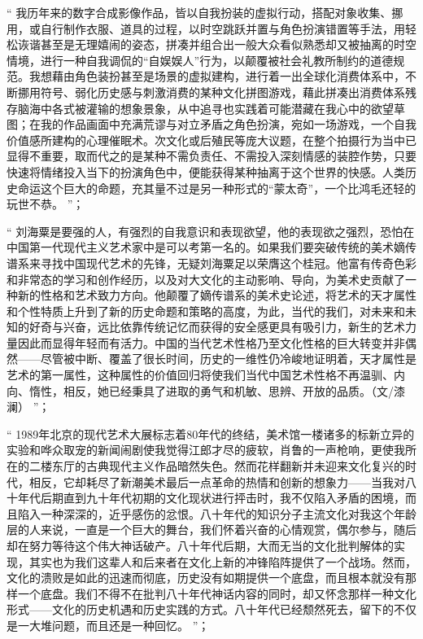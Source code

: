 \documentclass[master,oneside]{zjuthesis}
\begin{document}
“ 我历年来的数字合成影像作品，皆以自我扮装的虚拟行动，搭配对象收集、挪用，或自行制作衣服、道具的过程，以时空跳跃并置与角色扮演错置等手法，用轻松诙谐甚至是无理嬉闹的姿态，拼凑并组合出一般大众看似熟悉却又被抽离的时空情境，进行一种自我调侃的“自娱娱人”行为，以颠覆被社会礼教所制约的道德规范。我想藉由角色装扮甚至是场景的虚拟建构，进行着一出全球化消费体系中，不断挪用符号、弱化历史感与刺激消费的某种文化拼图游戏，藉此拼凑出消费体系残存脑海中各式被灌输的想象景象，从中追寻也实践着可能潜藏在我心中的欲望草图；在我的作品画面中充满荒谬与对立矛盾之角色扮演，宛如一场游戏，一个自我价值感所建构的心理催眠术。次文化或后殖民等庞大议题，在整个拍摄行为当中已显得不重要，取而代之的是某种不需负责任、不需投入深刻情感的装腔作势，只要快速将情绪投入当下的扮演角色中，便能获得某种抽离于这个世界的快感。人类历史命运这个巨大的命题，充其量不过是另一种形式的“蒙太奇”，一个比鸿毛还轻的玩世不恭。 ”；

“ 刘海粟是要强的人，有强烈的自我意识和表现欲望，他的表现欲之强烈，恐怕在中国第一代现代主义艺术家中是可以考第一名的。如果我们要突破传统的美术嫡传谱系来寻找中国现代艺术的先锋，无疑刘海粟足以荣膺这个桂冠。他富有传奇色彩和非常态的学习和创作经历，以及对大文化的主动影响、导向，为美术史贡献了一种新的性格和艺术致力方向。他颠覆了嫡传谱系的美术史论述，将艺术的天才属性和个性特质上升到了新的历史命题和策略的高度，为此，当代的我们，对未来和未知的好奇与兴奋，远比依靠传统记忆而获得的安全感更具有吸引力，新生的艺术力量因此而显得年轻而有活力。中国的当代艺术性格乃至文化性格的巨大转变并非偶然——尽管被中断、覆盖了很长时间，历史的一维性仍冷峻地证明着，天才属性是艺术的第一属性，这种属性的价值回归将使我们当代中国艺术性格不再温驯、内向、惰性，相反，她已经秉具了进取的勇气和机敏、思辨、开放的品质。（文/漆澜） ”；

“ 1989年北京的现代艺术大展标志着80年代的终结，美术馆一楼诸多的标新立异的实验和哗众取宠的新闻闹剧使我觉得江郎才尽的疲软，肖鲁的一声枪响，更使我所在的二楼东厅的古典现代主义作品暗然失色。然而花样翻新并未迎来文化复兴的时代，相反，它却耗尽了新潮美术最后一点革命的热情和创新的想象力——当我对八十年代后期直到九十年代初期的文化现状进行抨击时，我不仅陷入矛盾的困境，而且陷入一种深深的，近乎感伤的忿恨。八十年代的知识分子主流文化对我这个年龄层的人来说，一直是一个巨大的舞台，我们怀着兴奋的心情观赏，偶尔参与，随后却在努力等待这个伟大神话破产。八十年代后期，大而无当的文化批判解体的实现，其实也为我们这辈人和后来者在文化上新的冲锋陷阵提供了一个战场。然而，文化的溃败是如此的迅速而彻底，历史没有如期提供一个底盘，而且根本就没有那样一个底盘。我们不得不在批判八十年代神话内容的同时，却又怀念那样一种文化形式——文化的历史机遇和历史实践的方式。八十年代已经颓然死去，留下的不仅是一大堆问题，而且还是一种回忆。 ”；
\end{document}
